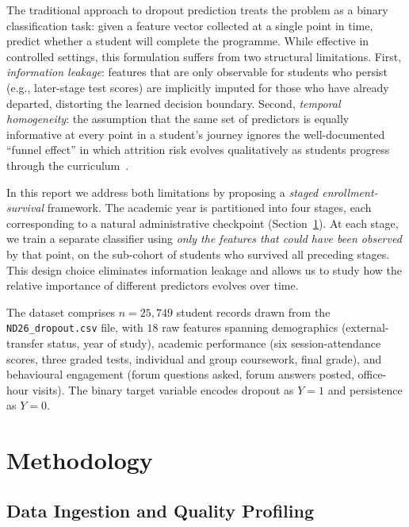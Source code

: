 \documentclass[8pt,twocolumn]{extarticle}
\begin{document}
The traditional approach to dropout prediction treats the problem as a binary classification
task: given a feature vector collected at a single point in time, predict whether a student
will complete the programme.  While effective in controlled settings, this formulation
suffers from two structural limitations.
First, \emph{information leakage}: features that are only observable for students who
persist (e.g., later-stage test scores) are implicitly imputed for those who have already
departed, distorting the learned decision boundary.
Second, \emph{temporal homogeneity}: the assumption that the same set of predictors is
equally informative at every point in a student's journey ignores the well-documented
``funnel effect'' in which attrition risk evolves qualitatively as students progress
through the curriculum~\cite{berger2012past}.

In this report we address both limitations by proposing a \emph{staged enrollment-survival}
framework.  The academic year is partitioned into four stages, each corresponding to a
natural administrative checkpoint (Section~\ref{sec:methodology}).
At each stage, we train a separate classifier using \emph{only the features that could
have been observed} by that point, on the sub-cohort of students who survived all
preceding stages.  This design choice eliminates information leakage and allows us to
study how the relative importance of different predictors evolves over time.

The dataset comprises $n = 25{,}749$ student records drawn from the \texttt{ND26\_dropout.csv}
file, with $18$ raw features spanning demographics (external-transfer status, year of study),
academic performance (six session-attendance scores, three graded tests, individual and
group coursework, final grade), and behavioural engagement (forum questions asked,
forum answers posted, office-hour visits).
The binary target variable encodes dropout as $Y = 1$ and persistence as $Y = 0$.

\section{Methodology}\label{sec:methodology}

\subsection{Data Ingestion and Quality Profiling}
\end{document}
